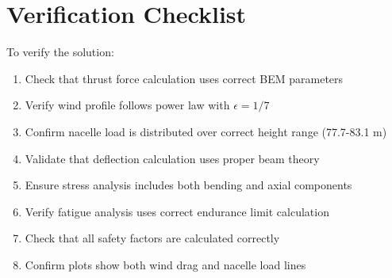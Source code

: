 \documentclass[11pt]{article}
\begin{document}
\section{Verification Checklist}
To verify the solution:
\begin{enumerate}
    \item Check that thrust force calculation uses correct BEM parameters
    \item Verify wind profile follows power law with $\epsilon = 1/7$
    \item Confirm nacelle load is distributed over correct height range (77.7-83.1 m)
    \item Validate that deflection calculation uses proper beam theory
    \item Ensure stress analysis includes both bending and axial components
    \item Verify fatigue analysis uses correct endurance limit calculation
    \item Check that all safety factors are calculated correctly
    \item Confirm plots show both wind drag and nacelle load lines
\end{enumerate}
\end{document}
